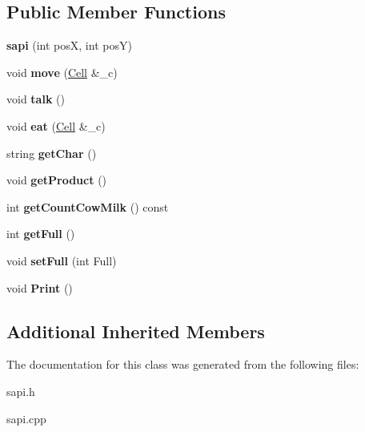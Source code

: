 \subsection*{Public Member Functions}
\begin{DoxyCompactItemize}
\item 
\mbox{\label{classsapi_a62abc4f374396934025399c7717c6403}} 
{\bfseries sapi} (int posX, int posY)
\item 
\mbox{\label{classsapi_a624bca7575e1fdecdcc8ac38ab662a9a}} 
void {\bfseries move} (\hyperlink{classCell}{Cell} \&\+\_\+c)
\item 
\mbox{\label{classsapi_a394f5198322bce5ddff6073207112021}} 
void {\bfseries talk} ()
\item 
\mbox{\label{classsapi_a6bb4f1e7efd67963063c96ffe741d34c}} 
void {\bfseries eat} (\hyperlink{classCell}{Cell} \&\+\_\+c)
\item 
\mbox{\label{classsapi_a63b013c6a91f03241f3d59fda2ec4376}} 
string {\bfseries get\+Char} ()
\item 
\mbox{\label{classsapi_aa300fe6b4b07e094cb712cd176fa94ee}} 
void {\bfseries get\+Product} ()
\item 
\mbox{\label{classsapi_ab8c576b92810a66d735dc40fa2d33430}} 
int {\bfseries get\+Count\+Cow\+Milk} () const
\item 
\mbox{\label{classsapi_ac2cea89f18795443a7ddb87d871768a0}} 
int {\bfseries get\+Full} ()
\item 
\mbox{\label{classsapi_a24a69158e59a6b8fab669517626e7d03}} 
void {\bfseries set\+Full} (int Full)
\item 
\mbox{\label{classsapi_ad39e03499c3e5870ab68fd9594ddae11}} 
void {\bfseries Print} ()
\end{DoxyCompactItemize}
\subsection*{Additional Inherited Members}


The documentation for this class was generated from the following files\+:\begin{DoxyCompactItemize}
\item 
sapi.\+h\item 
sapi.\+cpp\end{DoxyCompactItemize}
